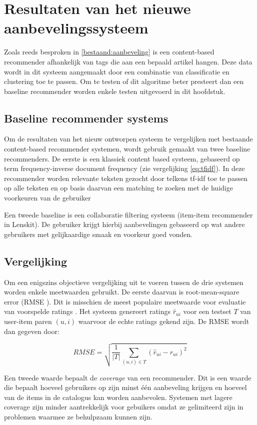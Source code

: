 \chapter{Resultaten van het nieuwe aanbevelingssysteem}\label{hs:resultaten}

Zoals reeds besproken in \ref{bestaand:aanbeveling} is een content-based recommender afhankelijk van tags die aan een bepaald artikel hangen. Deze data wordt in dit systeem aangemaakt door een combinatie van classificatie en clustering toe te passen. Om te testen of dit algoritme beter presteert dan een baseline recommender worden enkele testen uitgevoerd in dit hoofdstuk. 

\section{Baseline recommender systems}
Om de resultaten van het nieuw ontworpen systeem te vergelijken met bestaande content-based recommender systemen, wordt gebruik gemaakt van twee baseline recommenders. De eerste is een klassiek content based systeem, gebaseerd op term frequency-inverse document frequency (zie vergelijking \ref{eq:tfidf}). In deze recommender worden relevante teksten gezocht door telkens tf-idf toe te passen op alle teksten en op basis daarvan een matching te zoeken met de huidige voorkeuren van de gebruiker

Een tweede baseline is een collaboratie filtering systeem (item-item recommender in Lenskit). De gebruiker krijgt hierbij aanbevelingen gebaseerd op wat andere gebruikers met gelijkaardige smaak en voorkeur goed vonden.

\section{Vergelijking}
Om een enigszins objectieve vergelijking uit te voeren tussen de drie systemen worden enkele meetwaarden gebruikt. De eerste daarvan is root-mean-square error (RMSE \cite{Hyndman2006}). Dit is misschien de meest populaire meetwaarde voor evaluatie van voorspelde ratings \cite{Shani2011}. Het systeem genereert ratings $\hat{r}_{ui}$ voor een testset $T$ van user-item paren $(u,i)$ waarvoor de echte ratings gekend zijn. De RMSE wordt dan gegeven door:

\begin{equation}
RMSE = \sqrt{\frac{1}{|T|}\sum_{(u,i)\in T}(\hat{r}_{ui}-r_{ui})^2}
\end{equation}

Een tweede waarde bepaalt de \textit{coverage }\cite{Herlocker2004} van een recommender. Dit is een waarde die bepaalt hoeveel gebruikers op zijn minst \'e\'en aanbeveling krijgen en hoeveel van de items in de catalogus kan worden aanbevolen. Systemen met lagere coverage zijn minder aantrekkelijk voor gebuikers omdat ze gelimiteerd zijn in problemen waarmee ze behulpzaam kunnen zijn.

